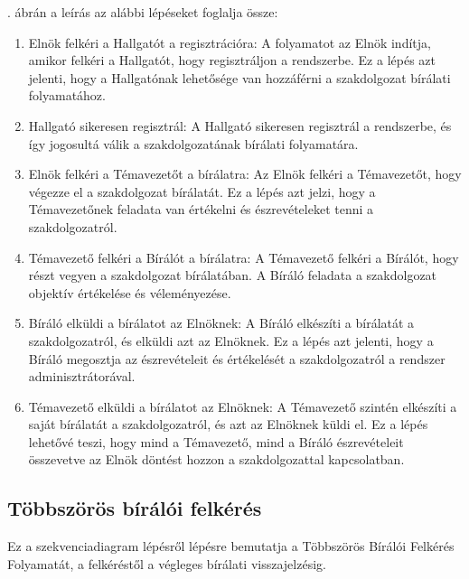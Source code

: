 \documentclass[a4paper,12pt]{article}
\begin{document}
. ábrán a leírás az alábbi lépéseket foglalja össze:
\begin{enumerate}
\item Elnök felkéri a Hallgatót a regisztrációra: A folyamatot az Elnök indítja, amikor felkéri a Hallgatót, hogy regisztráljon a rendszerbe. Ez a lépés azt jelenti, hogy a Hallgatónak lehetősége van hozzáférni a szakdolgozat bírálati folyamatához.

\item Hallgató sikeresen regisztrál: A Hallgató sikeresen regisztrál a rendszerbe, és így jogosultá válik a szakdolgozatának bírálati folyamatára.

\item Elnök felkéri a Témavezetőt a bírálatra: Az Elnök felkéri a Témavezetőt, hogy végezze el a szakdolgozat bírálatát. Ez a lépés azt jelzi, hogy a Témavezetőnek feladata van értékelni és észrevételeket tenni a szakdolgozatról.

\item Témavezető felkéri a Bírálót a bírálatra: A Témavezető felkéri a Bírálót, hogy részt vegyen a szakdolgozat bírálatában. A Bíráló feladata a szakdolgozat objektív értékelése és véleményezése.

\item Bíráló elküldi a bírálatot az Elnöknek: A Bíráló elkészíti a bírálatát a szakdolgozatról, és elküldi azt az Elnöknek. Ez a lépés azt jelenti, hogy a Bíráló megosztja az észrevételeit és értékelését a szakdolgozatról a rendszer adminisztrátorával.

\item Témavezető elküldi a bírálatot az Elnöknek: A Témavezető szintén elkészíti a saját bírálatát a szakdolgozatról, és azt az Elnöknek küldi el. Ez a lépés lehetővé teszi, hogy mind a Témavezető, mind a Bíráló észrevételeit összevetve az Elnök döntést hozzon a szakdolgozattal kapcsolatban.
\end{enumerate}

\subsection{Többszörös bírálói felkérés}

Ez a szekvenciadiagram lépésről lépésre bemutatja a Többszörös Bírálói Felkérés Folyamatát, a felkéréstől a végleges bírálati visszajelzésig.
\end{document}
